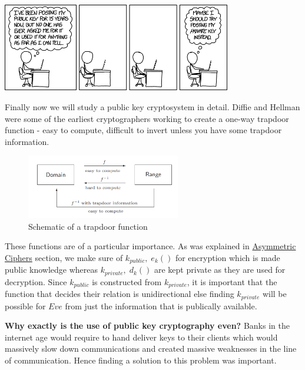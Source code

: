
\begin{center}
	\includegraphics[width=0.75\textwidth]{Photos/Diffie_Hellman.png}
\end{center}

		Finally now we will study a public key cryptosystem in detail. Diffie and Hellman were some of the earliest cryptographers working to create a one-way trapdoor function - easy to compute, difficult to invert unless you have some trapdoor information.
		\begin{figure}
			\caption{Schematic of a trapdoor function}
			\includegraphics[width=0.6\textwidth]{Photos/DH_1.png}
		\end{figure} 

		These functions are of a particular importance. As was explained in \textcolor{teal}{\hyperref[sec:asym]{Asymmetric Ciphers}} section, we make sure of \(k_{public}, \; e_k()\) for encryption which is made public knowledge whereas \(k_{private},\; d_k()\) are kept private as they are used for decryption. Since \(k_{public}\) is constructed from \(k_{private}\), it is important that the function that decides their relation is unidirectional else finding \(k_{private}\) will be possible for \(Eve\) from just the information that is publically available.

		\begin{mybox}
			\textbf{Why exactly is the use of public key cryptography even?}
			\tcblower
			Banks in the internet age would require to hand deliver keys to their clients which would massively slow down communications and created massive weaknesses in the line of communication. Hence finding a solution to this problem was important.
		\end{mybox}

